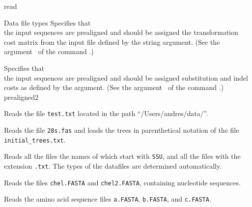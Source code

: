 \begin{command}{read}{}
\begin{arguments}
\begin{argumentgroup}{Data file types}
            {Specifies that \\ the input sequences are prealigned and
            should be assigned the transformation cost matrix from the 
            input file defined by the string argument. (See the argument~ 
            of the command .)}
            {}
        
            {Specifies that\\ the input sequences are prealigned and should be
            assigned substitution and indel costs as defined by the
             argument. (See the argument~ 
            of the command .)}
            {prealigned2}

	\end{argumentgroup}
		
	\end{arguments}


	\begin{poyexamples}
	
            {Reads the file \texttt{test.txt} located in the path
            ``/Users/andres/data/''.}

            {Reads the file \texttt{28s.fas} and loads the trees in parenthetical notation
            of the file \texttt{initial\_trees.txt}.}

            {Reads all the files the names of which start with \texttt{SSU}, and all the
            files with the extension \texttt{.txt}. The types of the datafiles are determined
            automatically.}
        
            {Reads the files \texttt{chel.FASTA} and \texttt{chel2.FASTA}, containing nucleotide
            sequences.}

            {Reads the amino acid sequence files \texttt{a.FASTA}, \texttt{b.FASTA}, and
            \texttt{c.FASTA}.}


\end{poyexamples}
\end{command}
